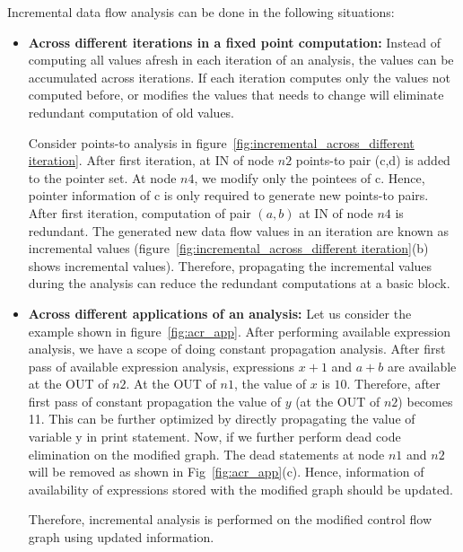 \documentclass[11pt,a4paper,openright]{report}
\begin{document}
Incremental data flow analysis can be done in the following situations:
\begin{itemize}
\item \textbf{Across different iterations in a fixed point computation:}\newline
Instead of computing all values afresh in each iteration of an analysis, the values can be accumulated across iterations. If each iteration 
computes only the values not computed before, or modifies the values that needs to change will eliminate redundant computation of old values.

Consider points-to analysis in figure~\ref{fig:incremental_across_different iteration}. After first iteration, at IN of node $n2$ points-to pair (c,d) is added 
to the pointer set. At node $n4$, we modify only the pointees of c. Hence, pointer information of c is only required to generate new points-to pairs. 
After first iteration, computation of pair $(a,b)$ at IN of node $n4$ is redundant. 
The generated new data flow values in an iteration are known as incremental values (figure~\ref{fig:incremental_across_different iteration}(b) shows
incremental values). Therefore, propagating the incremental values during the analysis can reduce the redundant computations at a basic block.

\item \textbf{Across different applications of an analysis:} \newline
Let us consider the example shown in figure~\ref{fig:acr_app}. After performing available expression analysis, we have a scope of doing constant propagation 
analysis. After first pass of available expression analysis, expressions $x+1$ and $a+b$ are available at the OUT of $n2$. At the OUT of $n1$, the value of $x$ 
is $10$. Therefore, after first pass of constant propagation the value of $y$ (at the OUT of $n2$) becomes 11. This can be further optimized by directly
propagating the value of variable y in print statement. Now, if we further perform dead code elimination on the modified graph. The dead 
statements at node $n1$ and $n2$ will be removed as shown in Fig~\ref{fig:acr_app}(c). Hence, information of availability of expressions stored with 
the modified graph should be updated.	

Therefore, incremental analysis is performed on the modified control flow graph using updated information.

\end{itemize}
\end{document}
